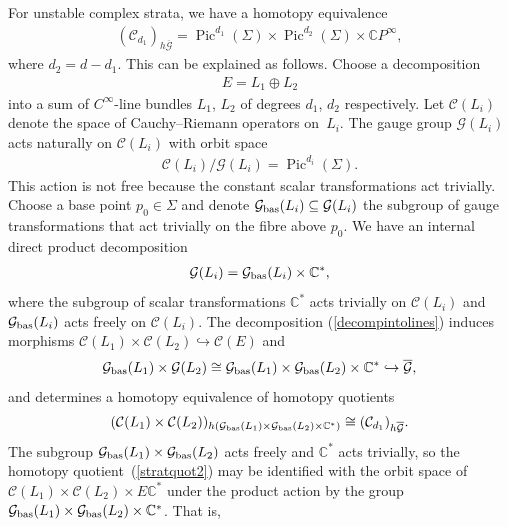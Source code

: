 \documentclass[10pt,a4paper]{amsart}
\numberwithin{equation}{section}
\begin{document}
For unstable complex strata, we have a homotopy equivalence
\begin{gather}\label{stratquot2} ({\mathcal C}_{d_1})_{h\overline{{\mathcal G}}} = \operatorname{Pic}^{d_1}(\Sigma) \times \operatorname{Pic}^{d_2}(\Sigma) \times {\mathbb C} P^{\infty} ,
\end{gather}
where $d_2 = d-d_1$. This can be explained as follows. Choose a decomposition
\begin{gather}\label{decompintolines} E = L_1 \oplus L_2
\end{gather} into a sum of $C^{\infty}$-line bundles $L_1$, $L_2$ of degrees $d_1$, $d_2$ respectively. Let ${\mathcal C}(L_i)$ denote the space of Cauchy--Riemann operators on~$L_i$. The gauge group ${\mathcal G}(L_i)$ acts naturally on ${\mathcal C}(L_i)$ with orbit space \begin{gather*}{\mathcal C}(L_i)/{\mathcal G}(L_i) = \operatorname{Pic}^{d_i}(\Sigma).\end{gather*}
This action is not free because the constant scalar transformations act trivially. Choose a base point $p_0 \in \Sigma$ and denote ${\mathcal G}_{\rm bas}(L_i) \subseteq {\mathcal G}(L_i)$ the subgroup of gauge transformations that act trivially on the f\/ibre above $p_0$. We have an internal direct product decomposition
\begin{gather*} {\mathcal G}(L_i) = {\mathcal G}_{\rm bas}(L_i) \times {\mathbb C}^* , \end{gather*}
where the subgroup of scalar transformations ${\mathbb C}^*$ acts trivially on ${\mathcal C}(L_i)$ and ${\mathcal G}_{\rm bas}(L_i)$ acts freely on ${\mathcal C}(L_i)$. The decomposition (\ref{decompintolines}) induces morphisms ${\mathcal C}(L_1) \times {\mathcal C}(L_2) \hookrightarrow {\mathcal C}(E)$ and \begin{gather*} {\mathcal G}_{\rm bas}(L_1) \times {\mathcal G}(L_2) \cong {\mathcal G}_{\rm bas}(L_1) \times {\mathcal G}_{\rm bas}(L_2) \times {\mathbb C}^* \hookrightarrow \overline{{\mathcal G}}, \end{gather*} and determines a homotopy equivalence of homotopy quotients~\cite[Section~7]{AB}
\begin{gather*}({\mathcal C}(L_1) \times {\mathcal C}(L_2))_{h ({\mathcal G}_{\rm bas}(L_1) \times {\mathcal G}_{\rm bas}(L_2) \times {\mathbb C}^*)} \cong ({\mathcal C}_{d_1})_{h\overline{{\mathcal G}}}. \end{gather*}
The subgroup ${\mathcal G}_{\rm bas}(L_1) \times {\mathcal G}_{\rm bas}(L_2)$ acts freely and ${\mathbb C}^*$ acts trivially, so the homotopy quotient~(\ref{stratquot2}) may be identif\/ied with the orbit space of ${\mathcal C}(L_1) \times {\mathcal C}(L_2) \times E{\mathbb C}^* $ under the product action by the group ${\mathcal G}_{\rm bas}(L_1) \times {\mathcal G}_{\rm bas}(L_2) \times {\mathbb C}^*$. That is,
\end{document}
